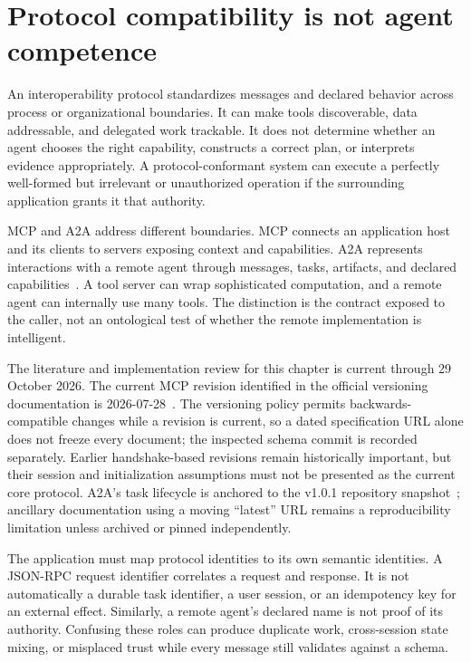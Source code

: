 \section{Protocol compatibility is not agent competence}\label{sec:C19:scope}
An interoperability protocol standardizes messages and declared behavior across process or organizational boundaries. It can make tools discoverable, data addressable, and delegated work trackable. It does not determine whether an agent chooses the right capability, constructs a correct plan, or interprets evidence appropriately. A protocol-conformant system can execute a perfectly well-formed but irrelevant or unauthorized operation if the surrounding application grants it that authority.

MCP and A2A address different boundaries. MCP connects an application host and its clients to servers exposing context and capabilities. A2A represents interactions with a remote agent through messages, tasks, artifacts, and declared capabilities~\cite{mcp2026spec,cumb2026a2aspec101}. A tool server can wrap sophisticated computation, and a remote agent can internally use many tools. The distinction is the contract exposed to the caller, not an ontological test of whether the remote implementation is intelligent.

The literature and implementation review for this chapter is current through 29 October 2026. The current MCP revision identified in the official versioning documentation is 2026-07-28~\cite{mcp2026versioning}. The versioning policy permits backwards-compatible changes while a revision is current, so a dated specification URL alone does not freeze every document; the inspected schema commit is recorded separately. Earlier handshake-based revisions remain historically important, but their session and initialization assumptions must not be presented as the current core protocol. A2A's task lifecycle is anchored to the v1.0.1 repository snapshot~\cite{a2a2026task}; ancillary documentation using a moving ``latest'' URL remains a reproducibility limitation unless archived or pinned independently.

The application must map protocol identities to its own semantic identities. A JSON-RPC request identifier correlates a request and response. It is not automatically a durable task identifier, a user session, or an idempotency key for an external effect. Similarly, a remote agent's declared name is not proof of its authority. Confusing these roles can produce duplicate work, cross-session state mixing, or misplaced trust while every message still validates against a schema.

